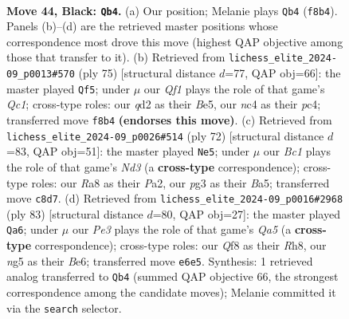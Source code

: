 \documentclass[11pt]{article}
\begin{document}
\clearpage

\begin{figure}[p]\centering
\begin{subfigure}{0.46\textwidth}\centering
\resizebox{\linewidth}{!}{%
\newchessgame
\chessboard[
  setfen={rnb2q2/1p4k1/4p3/p2n1pNp/P1N2P2/1P4P1/3QB1KP/7R b - - 1 44},
  showmover=false,
  pgfstyle=straightmove, color=movearrow, markmove={f8-b4}
]}
\caption{}
\end{subfigure}\hfill
\begin{subfigure}{0.46\textwidth}\centering
\resizebox{\linewidth}{!}{%
\newchessgame
\chessboard[
  setfen={2q3k1/5p2/3p2p1/2pPb1Pp/2PnrN1P/1P6/3B2K1/3Q1R2 b - - 2 38},
  showmover=false,
  pgfstyle=straightmove, color=movearrow, markmove={c8-f5}
]}
\caption{}
\end{subfigure}
\\[4pt]
\begin{subfigure}{0.46\textwidth}\centering
\resizebox{\linewidth}{!}{%
\newchessgame
\chessboard[
  setfen={6k1/1q4p1/2p1pbp1/B1Pp4/1P1Pn1P1/3N4/P5K1/5Q2 w - - 1 37},
  showmover=false,
  pgfstyle=straightmove, color=movearrow, markmove={d3-e5}
]}
\caption{}
\end{subfigure}\hfill
\begin{subfigure}{0.46\textwidth}\centering
\resizebox{\linewidth}{!}{%
\newchessgame
\chessboard[
  setfen={4k2r/8/2n1b3/2QpPpB1/qp1P3p/7P/3N1PPK/8 b - - 0 42},
  showmover=false,
  pgfstyle=straightmove, color=movearrow, markmove={a4-a6}
]}
\caption{}
\end{subfigure}
\caption{\textbf{Move 44, Black: \texttt{Qb4}.} (a) Our position; Melanie plays \texttt{Qb4} (\texttt{f8b4}). Panels (b)--(d) are the retrieved master positions whose correspondence most drove this move (highest QAP objective among those that transfer to it). (b) Retrieved from \texttt{lichess\_elite\_2024-09\_p0013\#570} (ply 75) [structural distance $d$=77, QAP obj=66]: the master played \texttt{Qf5}; under $\mu$ our \emph{Qf1} plays the role of that game's \emph{Qc1}; cross-type roles: our \emph{q}d2 as their \emph{B}e5, our \emph{n}c4 as their \emph{p}c4; transferred move \texttt{f8b4} \textbf{(endorses this move)}. (c) Retrieved from \texttt{lichess\_elite\_2024-09\_p0026\#514} (ply 72) [structural distance $d$=83, QAP obj=51]: the master played \texttt{Ne5}; under $\mu$ our \emph{Bc1} plays the role of that game's \emph{Nd3} (a \textbf{cross-type} correspondence); cross-type roles: our \emph{R}a8 as their \emph{P}a2, our \emph{p}g3 as their \emph{B}a5; transferred move \texttt{c8d7}. (d) Retrieved from \texttt{lichess\_elite\_2024-09\_p0016\#2968} (ply 83) [structural distance $d$=80, QAP obj=27]: the master played \texttt{Qa6}; under $\mu$ our \emph{Pe3} plays the role of that game's \emph{Qa5} (a \textbf{cross-type} correspondence); cross-type roles: our \emph{Q}f8 as their \emph{R}h8, our \emph{n}g5 as their \emph{B}e6; transferred move \texttt{e6e5}. Synthesis: 1 retrieved analog transferred to \texttt{Qb4} (summed QAP objective 66, the strongest correspondence among the candidate moves); Melanie committed it via the \texttt{search} selector.}
\label{fig:thought-m87}
\end{figure}
\end{document}
